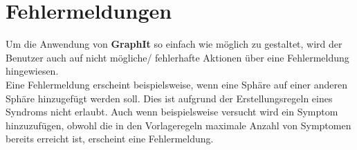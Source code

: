 \documentclass[enabledeprecatedfontcommands,fontsize=11pt,paper=a4,twoside]{scrartcl}
\newcounter{one}
\begin{document}
\section{Fehlermeldungen} \label{fehlermeldungen}

Um die Anwendung von \textbf{GraphIt} so einfach wie möglich zu gestaltet, wird der Benutzer auch auf nicht mögliche/ fehlerhafte Aktionen über eine Fehlermeldung hingewiesen. \\
Eine Fehlermeldung erscheint beispielsweise, wenn eine Sphäre auf einer anderen Sphäre hinzugefügt werden soll. Dies ist aufgrund der Erstellungsregeln eines Syndroms nicht erlaubt. Auch wenn beispielsweise versucht wird ein Symptom hinzuzufügen, obwohl die in den Vorlageregeln maximale Anzahl von Symptomen bereits erreicht ist, erscheint eine Fehlermeldung.

\begin{figure}[ht!]
	\centering
\end{figure}

\clearpage
\end{document}
